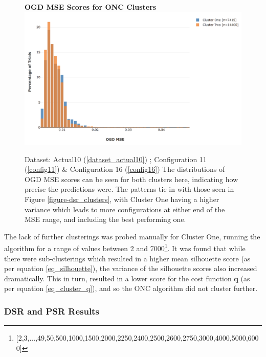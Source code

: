 \documentclass[a4paper,11pt,oneside]{article}
\theoremstyle{plain}
\theoremstyle{definition}
\begin{document}
	\begin{figure}[H]
		\centering
		\textbf{OGD MSE Scores for ONC Clusters}
		\includegraphics[scale=0.4]{images/results/dsr/cluster_distributions_mse.png} 
		\caption[OGD MSE Scores for ONC Clusters]{Dataset: Actual10 (\ref{dataset_actual10}) ; Configuration 11 (\ref{config11}) \&  Configuration 16 (\ref{config16})
			\newline The distributions of OGD MSE scores can be seen for both clusters here, indicating how precise the predictions were. The patterns tie in with those seen in Figure \ref{figure-dsr_clusters}, with Cluster One having a higher variance which leads to more configurations at either end of the MSE range, and including the best performing one.}
		\label{figure-dsr_clusters_mse}
	\end{figure}
	
	The lack of further clusterings was probed manually for Cluster One, running the algorithm for a range of values between 2 and 7000\footnote{[2,3,...,49,50,500,1000,1500,2000,2250,2400,2500,2600,2750,3000,4000,5000,6000]}. It was found that while there were sub-clusterings which resulted in a higher mean silhouette score (as per equation \eqref{eq_silhouette}), the variance of the silhouette scores also increased dramatically. This in turn, resulted in a lower score for the cost function $\mathbf{q}$ (as per equation \eqref{eq_cluster_q}), and so the ONC algorithm did not cluster further.
	
	\subsubsection{DSR and PSR Results}\label{results_dsr2}
	
\end{document}
